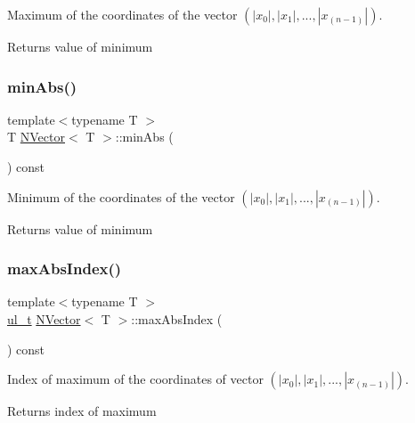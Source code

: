 Maximum of the coordinates of the vector $ (|x_0|, |x_1|, ..., |x_{(n-1)}|) $. 

\begin{DoxyReturn}{Returns}
value of minimum 
\end{DoxyReturn}
\mbox{\label{class_n_vector_a857878b360cede51eb87924cd46d5a54}} 
\subsubsection{\texorpdfstring{minAbs()}{minAbs()}}
{\footnotesize\ttfamily template$<$typename T $>$ \\
T \mbox{\hyperlink{class_n_vector}{N\+Vector}}$<$ T $>$\+::min\+Abs (\begin{DoxyParamCaption}{ }\end{DoxyParamCaption}) const}



Minimum of the coordinates of the vector $ (|x_0|, |x_1|, ..., |x_{(n-1)}|) $. 

\begin{DoxyReturn}{Returns}
value of minimum 
\end{DoxyReturn}
\mbox{\label{class_n_vector_ac7d7d39b68956da9018684a3706a70c2}} 
\subsubsection{\texorpdfstring{maxAbsIndex()}{maxAbsIndex()}}
{\footnotesize\ttfamily template$<$typename T $>$ \\
\mbox{\hyperlink{typedef_8h_a1b140a2034db3f5dfe18a987745df43a}{ul\+\_\+t}} \mbox{\hyperlink{class_n_vector}{N\+Vector}}$<$ T $>$\+::max\+Abs\+Index (\begin{DoxyParamCaption}{ }\end{DoxyParamCaption}) const}



Index of maximum of the coordinates of vector $ (|x_0|, |x_1|, ..., |x_{(n-1)}|) $. 

\begin{DoxyReturn}{Returns}
index of maximum 
\end{DoxyReturn}
\mbox{\label{class_n_vector_a8b9147431ee1f9c5a25c6e0b2f793c40}} 
